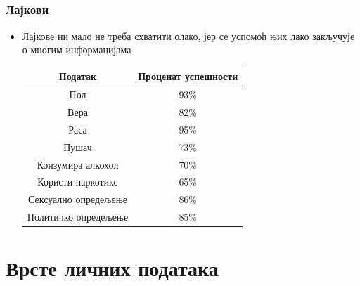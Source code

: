 \documentclass{beamer}
\begin{document}
\subsection{}

\begin{frame}[fragile]\frametitle{Лајкови}
	\begin{itemize}	
		\item Лајкове ни мало не треба схватити олако, јер се успомоћ њих лако закључује о многим информацијама
		\begin{table}[h!]
\begin{center}

\begin{tabular}{|c|c|} \hline
\textbf{Податак} &\textbf{Проценат успешности}\\ \hline
Пол &93\% \\ \hline
Вера &82\%\\ \hline
Раса & 95\%\\ \hline
Пушач &73\% \\ \hline
Конзумира алкохол &70\% \\ \hline
Користи наркотике & 65\% \\ \hline
Сексуално опредељење &86\% \\ \hline
Политичко опредељење &85\% \\ \hline

\end{tabular}
\label{tab:tabela1}
\end{center}
\end{table}

	\end{itemize}
\end{frame}

\section{Врсте личних података}
\end{document}
